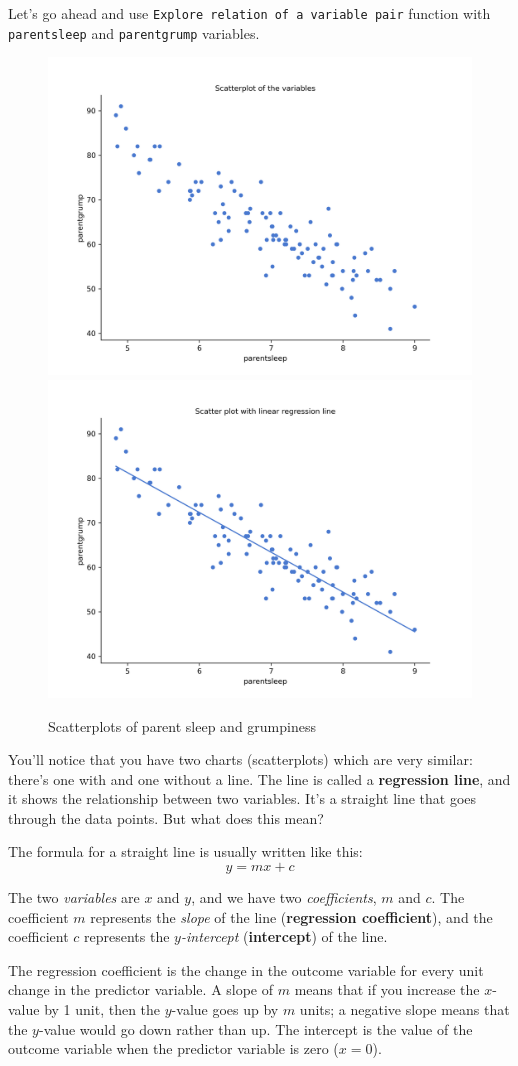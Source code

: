 \documentclass[
]{book}
\theoremstyle{definition}
\theoremstyle{definition}
\theoremstyle{definition}
\theoremstyle{definition}
\theoremstyle{remark}
\begin{document}
Let's go ahead and use \texttt{Explore\ relation\ of\ a\ variable\ pair} function with \texttt{parentsleep} and \texttt{parentgrump} variables.

\begin{figure}

{\centering \includegraphics[width=0.45\linewidth]{resources/image/parentsleepgrumpplotnolinreg} \includegraphics[width=0.45\linewidth]{resources/image/parentsleepgrumpplot} 

}

\caption{Scatterplots of parent sleep and grumpiness}\label{fig:parentscatters}
\end{figure}

You'll notice that you have two charts (scatterplots) which are very similar: there's one with and one without a line. The line is called a \textbf{regression line}, and it shows the relationship between two variables. It's a straight line that goes through the data points. But what does this mean?

The formula for a straight line is usually written like this:
\[
y = mx + c
\]

The two \emph{variables} are \(x\) and \(y\), and we have two \emph{coefficients}, \(m\) and \(c\). The coefficient \(m\) represents the \emph{slope} of the line (\textbf{regression coefficient}), and the coefficient \(c\) represents the \emph{\(y\)-intercept} (\textbf{intercept}) of the line.

The regression coefficient is the change in the outcome variable for every unit change in the predictor variable. A slope of \(m\) means that if you increase the \(x\)-value by 1 unit, then the \(y\)-value goes up by \(m\) units; a negative slope means that the \(y\)-value would go down rather than up. The intercept is the value of the outcome variable when the predictor variable is zero (\(x=0\)).
\end{document}
